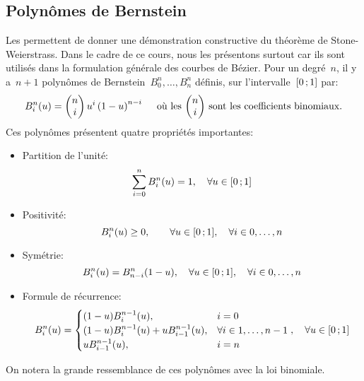 \medskip
\subsection{Polynômes de Bernstein} 

Les  permettent de donner une démonstration constructive du théorème de Stone-Weierstrass. Dans le cadre de ce cours, nous les présentons surtout car ils sont utilisés dans la formulation générale des courbes de Bézier. Pour un degré~$n$, il y a~$n+1$ polynômes de Bernstein~$B^n_0, \dots, B^n_n$ définis, sur l'intervalle~$\mathopen{[}0\,;1\mathclose{]}$ par: 
\begin{equation}
 B_i^n(u) = 
\begin{pmatrix} n \\ i 
\end{pmatrix} u^i \left( 1-u \right)^{n-i} \quad \text{ où les~$
\begin{pmatrix} n \\ i 
\end{pmatrix}$ sont les coefficients binomiaux.}
\end{equation}
Ces polynômes présentent quatre propriétés importantes: 
\begin{itemize}
\item Partition de l'unité:
\begin{equation}
\displaystyle\sum_{i=0}^n B_i^n(u) = 1,\quad \forall u \in \mathopen{[}0\,;1\mathclose{]}
\end{equation}
\item Positivité:
\begin{equation}
B_i^n(u)\geq 0,\qquad\forall u\in \mathopen{[}0\,;1\mathclose{]},\quad\forall i\in 0,\dots,n
\end{equation}
\item Symétrie:
\begin{equation}
B_i^n(u) = B_{n-i}^n(1-u), \quad \forall u \in \mathopen{[}0\,;1\mathclose{]},\quad \forall i \in 0, \dots, n
\end{equation}
\item Formule de récurrence:
\begin{equation}
B_i^n(u) = 
\begin{cases} (1-u)B_i^{n-1}(u),& i = 0\\ (1-u)B_i^{n-1}(u) + u B_{i-1}^{n-1}(u),&\forall i \in 1, \dots, n-1\\ uB_{i-1}^{n-1}(u),& i = n 
\end{cases},\quad \forall u \in \mathopen{[}0\,;1\mathclose{]}
\end{equation}
\end{itemize}
On notera la grande ressemblance de ces polynômes avec la loi binomiale. 

